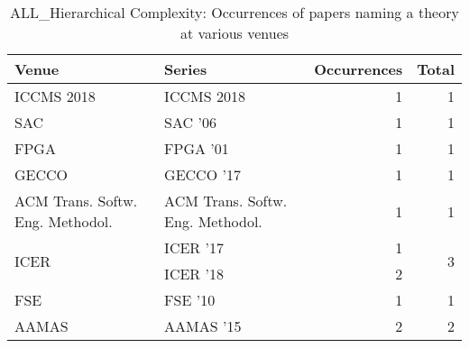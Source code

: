\begin{table*}[t]
\begin{tabular}{llrr}
Venue & Series & Occurrences & Total\\\hline
\multirow{1}{*}{ICCMS 2018} & ICCMS 2018 & 1 & \multirow{1}{*}{1}\\
\multirow{1}{*}{SAC } & SAC '06 & 1 & \multirow{1}{*}{1}\\
\multirow{1}{*}{FPGA } & FPGA '01 & 1 & \multirow{1}{*}{1}\\
\multirow{1}{*}{GECCO } & GECCO '17 & 1 & \multirow{1}{*}{1}\\
\multirow{1}{*}{ACM Trans. Softw. Eng. Methodol.} & ACM Trans. Softw. Eng. Methodol. & 1 & \multirow{1}{*}{1}\\
\multirow{2}{*}{ICER } & ICER '17 & 1 & \multirow{2}{*}{3}\\
& ICER '18 & 2 &\\
\multirow{1}{*}{FSE } & FSE '10 & 1 & \multirow{1}{*}{1}\\
\multirow{1}{*}{AAMAS } & AAMAS '15 & 2 & \multirow{1}{*}{2}\\
\end{tabular}
\caption{ALL\_Hierarchical Complexity: Occurrences of papers naming a theory at various venues}
\end{table*}